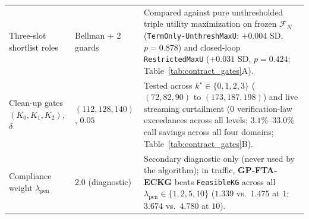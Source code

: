 \begin{table}[htbp]
{\begin{tabular}{llp{7.8cm}}
Three-slot shortlist roles & Bellman + 2 guards & Compared against pure unthresholded triple utility maximization on frozen $\mathcal{F}_N$ (\texttt{TermOnly-UnthreshMaxU}: $+0.004$ SD, $p=0.878$) and closed-loop \texttt{RestrictedMaxU} ($+0.031$ SD, $p=0.424$; Table~\ref*{tab:contract_gates}A). \\
Clean-up gates $(K_0,K_1,K_2)$, $\delta$ & $(112,128,140)$, $0.05$ & Tested across $k^\star\in\{0,1,2,3\}$ ($(72,82,90)$ to $(173,187,198)$) and live streaming curtailment ($0$ verification-law exceedances across all levels; $3.1\%$--$33.0\%$ call savings across all four domains; Table~\ref*{tab:contract_gates}B). \\
Compliance weight $\lambda_{\mathrm{pen}}$ & $2.0$ (diagnostic) & Secondary diagnostic only (never used by the algorithm); in traffic, \textbf{GP-FTA-ECKG} beats \texttt{FeasibleKG} across all $\lambda_{\mathrm{pen}}\in\{1,2,5,10\}$ ($1.339$ vs.\ $1.475$ at $1$; $3.674$ vs.\ $4.780$ at $10$). \\
\bottomrule
\end{tabular}%
}
\end{table}

